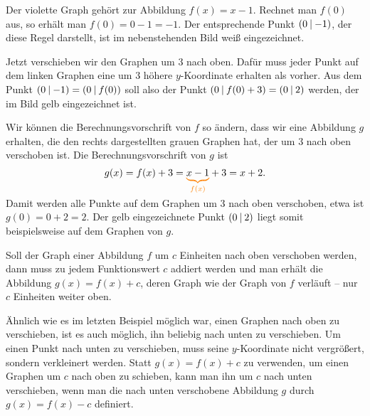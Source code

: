 \documentclass[../../main.tex]{subfiles}
\begin{document}
\begin{example}{}
    Der violette Graph gehört zur Abbildung \mbox{$f(x)=x-1$}. Rechnet man $f(0)$ aus, so erhält man \mbox{$f(0)=0-1=-1$}. Der entsprechende Punkt $\left(0 \:\middle|\: -1\right)$, der diese Regel darstellt, ist im nebenstehenden Bild weiß eingezeichnet.
    
    Jetzt verschieben wir den Graphen um $3$ nach oben. Dafür muss jeder Punkt auf dem linken Graphen eine um $3$ höhere $y$-Koordinate erhalten als vorher. Aus dem Punkt $\left(0 \:\middle|\: -1\right)=\left(0 \:\middle|\: f(0)\right)$ soll also der Punkt $\left(0 \:\middle|\: f(0)+3\right)=\left(0 \:\middle|\: 2\right)$ werden, der im Bild gelb eingezeichnet ist.
    
    Wir können die Berechnungsvorschrift von $f$ so ändern, dass wir eine Abbildung $g$ erhalten, die den rechts dargestellten grauen Graphen hat, der um $3$ nach oben verschoben ist. Die Berechnungsvorschrift von $g$ ist \[g(x)=f(x)+3=\colorbrace{x-1}{f(x)}+3=x+2.\] 
    Damit werden alle Punkte auf dem Graphen um $3$ nach oben verschoben, etwa ist $g(0)=0+2=2$. Der gelb eingezeichnete Punkt $\left(0 \:\middle|\: 2\right)$ liegt somit beispielsweise auf dem Graphen von $g$.
\end{example}

\sloppy
Soll der Graph einer Abbildung $f$ um $c$ Einheiten nach oben verschoben werden, dann muss zu jedem Funktionswert $c$ addiert werden und man erhält die Abbildung \mbox{$g(x)=f(x)+c$}, deren Graph wie der Graph von $f$ verläuft -- nur $c$ Einheiten weiter oben.

\fussy
Ähnlich wie es im letzten Beispiel möglich war, einen Graphen nach oben zu verschieben, ist es auch möglich, ihn beliebig nach unten zu verschieben. Um einen Punkt nach unten zu verschieben, muss seine $y$-Koordinate nicht vergrößert, sondern verkleinert werden. Statt $g(x)=f(x)+c$ zu verwenden, um einen Graphen um $c$ nach oben zu schieben, kann man ihn um $c$ nach unten verschieben, wenn man die nach unten verschobene Abbildung $g$ durch $g(x)=f(x)-c$ definiert.
\end{document}
